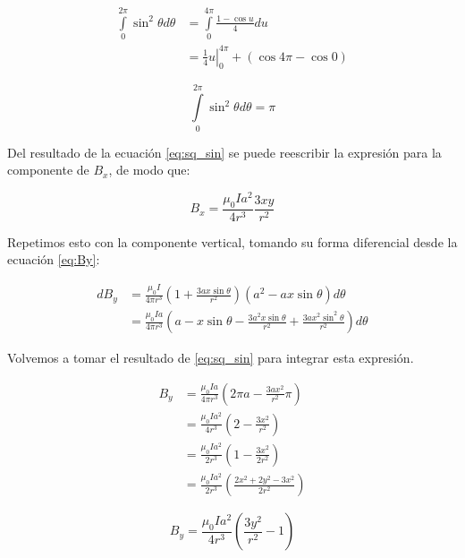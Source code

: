 \documentclass{article}
\begin{document}
\[
	\begin{aligned}
		\int\limits_{0}^{2 \pi} \sin^2 \theta d \theta & = \int\limits_{0}^{4 \pi} \frac{1 - \cos u }{4} d u                 \\
		                                               & = \left. \frac{1}{4}u \right|_{0}^{4 \pi} + ( \cos 4 \pi - \cos 0 )
	\end{aligned}
\]

\begin{equation} \label{eq:sq_sin}
	\int\limits_{0}^{2 \pi} \sin^2 \theta d \theta = \pi
\end{equation}

Del resultado de la ecuación \ref{eq:sq_sin} se puede reescribir la expresión para la componente de \(B_x\), de modo que:

\begin{equation}
	B_x = \frac{\mu_0 I a^2}{4 r^3} \frac{3 x y }{r^2}
\end{equation}

Repetimos esto con la componente vertical, tomando su forma diferencial desde la ecuación \ref{eq:By}:

\[
	\begin{aligned}
		d B_y & = \frac{\mu_0 I}{4 \pi r^3} \left( 1 + \frac{3 a x \sin \theta}{r^2} \right) (a^2 - a x \sin \theta) d \theta                                 \\
		      & = \frac{\mu_0 I a}{4 \pi r^3} \left( a - x \sin \theta - \frac{3a^2 x \sin \theta}{r^2} + \frac{3 a x^2 \sin ^2 \theta}{r^2} \right) d \theta
	\end{aligned}
\]

Volvemos a tomar el resultado de \ref{eq:sq_sin} para integrar esta expresión.

\[
	\begin{aligned}
		B_y & = \frac{\mu_0 I a}{4 \pi r^3} \left( 2 \pi a - \frac{3 a x^2}{r^2} \pi \right) \\
		    & = \frac{\mu_0 I a^2}{4 r^3} \left( 2 - \frac{3x^2}{r^2} \right)                \\
		    & = \frac{\mu_0 I a^2}{2 r^3} \left( 1 - \frac{3 x^2}{2 r^2} \right)             \\
		    & = \frac{\mu_0 I a^2}{2 r^3} \left( \frac{2 x^2 + 2 y^2 - 3x^2}{2r^2} \right)
	\end{aligned}
\]

\begin{equation}
	B_y = \frac{\mu_0 I a^2}{4 r^3} \left( \frac{3 y^2}{r^2} - 1 \right)
\end{equation}
\end{document}
